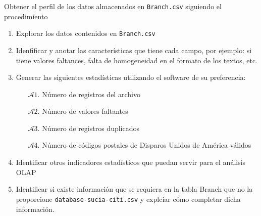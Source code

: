 Obtener el perfil de los datos almacenados en \texttt{Branch.csv} 
siguiendo el procedimiento

\begin{enumerate}
    \item Explorar los datos contenidos en \texttt{Branch.csv}
    
    \item Idenfificar y anotar las características que tiene 
        cada campo, por ejemplo: si tiene valores faltances, 
        falta de homogeneidad en el formato de los textos, etc.
    
    \item Generar las siguientes estadísticas utilizando el 
        software de su preferencia:
        \begin{itemize}
            \item[$\mathcal{A}1$.] Número de registros del archivo
            \item[$\mathcal{A}2$.] Número de valores faltantes
            \item[$\mathcal{A}3$.] Número de registros duplicados
            \item[$\mathcal{A}4$.] Número de códigos postales de 
                Disparos Unidos de América válidos     
        \end{itemize}
    
    \item Identificar otros indicadores estadísticos que puedan 
        servir para el análisis OLAP
    
    \item Identificar si existe información que se requiera en la 
        tabla Branch que no la proporcione \texttt{database-sucia-citi.csv}
        y explciar cómo completar dicha información. 

\end{enumerate}